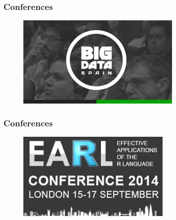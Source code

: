 \documentclass[PredictiveAnalytics101.tex]{subfiles}
\begin{document}
\begin{frame}
\frametitle{Conferences}
\Large
\begin{figure}
\centering
\includegraphics[width=0.99\linewidth]{images/bigdataspain}
\end{figure}
\end{frame}
\begin{frame}
\frametitle{Conferences}
\Large
\begin{figure}
\centering
\includegraphics[width=0.99\linewidth]{images/EARLconference}
\end{figure}
\end{frame}
\end{document}
